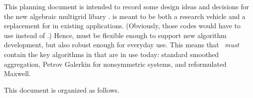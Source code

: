 This planning document is intended to record some design ideas and decisions for the new algebraic multigrid libary \mloo.
\mloo is meant to be both a research vehicle and a replacement for \ML in existing applications.  (Obviously,
those codes would have to use \Tpetra instead of \Epetra.)  Hence, \mloo must be flexible enough to
support new algorithm development, but also robust enough for everyday use.  This means
that \mloo\ {\em must} contain the key algorithms in \ML that are in use today:  standard smoothed
aggregation, Petrov Galerkin for nonsymmetric systems, and reformulated Maxwell.

This document is organized as follows.
